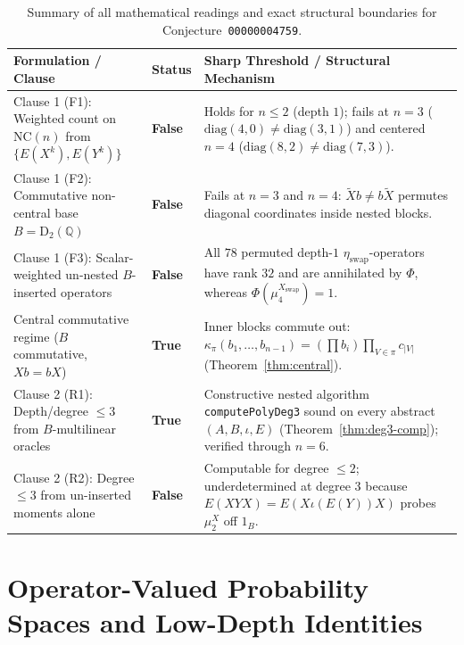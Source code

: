 \documentclass[11pt,a4paper]{article}
\theoremstyle{definition}
\newcommand{\NC}{\mathrm{NC}}
\newcommand{\Diag}{\mathrm{D}}
\begin{document}
\begin{table}[ht]
\centering
\small
\renewcommand{\arraystretch}{1.22}
\begin{tabular}{@{}p{4.3cm}p{2.3cm}p{7.8cm}@{}}
\toprule
\textbf{Formulation / Clause} & \textbf{Status} & \textbf{Sharp Threshold / Structural Mechanism} \\
\midrule
Clause 1 (F1): Weighted count on $\NC(n)$ from $\{E(X^k), E(Y^k)\}$ & \textbf{False} & Holds for $n \le 2$ (depth $1$); fails at $n = 3$ ($\mathrm{diag}(4,0) \neq \mathrm{diag}(3,1)$) and centered $n = 4$ ($\mathrm{diag}(8,2) \neq \mathrm{diag}(7,3)$). \\
Clause 1 (F2): Commutative non-central base $B = \Diag_2(\mathbb{Q})$ & \textbf{False} & Fails at $n = 3$ and $n = 4$: $\tilde{X} b \neq b \tilde{X}$ permutes diagonal coordinates inside nested blocks. \\
Clause 1 (F3): Scalar-weighted un-nested $B$-inserted operators & \textbf{False} & All $78$ permuted depth-$1$ $\eta_{\mathrm{swap}}$-operators have rank $32$ and are annihilated by $\Phi$, whereas $\Phi(\mu_4^{X_{\mathrm{swap}}}) = 1$. \\
Central commutative regime ($B$ commutative, $X b = b X$) & \textbf{True} & Inner blocks commute out: $\kappa_\pi(b_1,\dots,b_{n-1}) = (\prod b_i)\prod_{V\in\pi} c_{|V|}$ (Theorem~\ref{thm:central}). \\
Clause 2 (R1): Depth/degree $\le 3$ from $B$-multilinear oracles & \textbf{True} & Constructive nested algorithm \texttt{computePolyDeg3} sound on every abstract $(A, B, \iota, E)$ (Theorem~\ref{thm:deg3-comp}); verified through $n = 6$. \\
Clause 2 (R2): Degree $\le 3$ from un-inserted moments alone & \textbf{False} & Computable for degree $\le 2$; underdetermined at degree $3$ because $E(X Y X) = E(X \iota(E(Y)) X)$ probes $\mu_2^X$ off $1_B$. \\
\bottomrule
\end{tabular}
\caption{Summary of all mathematical readings and exact structural boundaries for Conjecture~\texttt{00000004759}.}
\label{tab:summary}
\end{table}

\section{Operator-Valued Probability Spaces and Low-Depth Identities}\label{sec:lowdepth}
\end{document}
